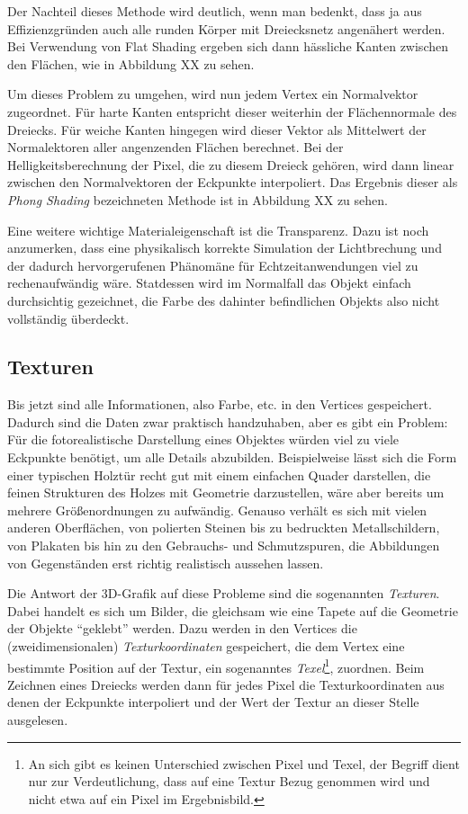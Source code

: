 
Der Nachteil dieses Methode wird deutlich, wenn man bedenkt, dass ja aus Effizienzgründen auch alle runden Körper mit Dreiecksnetz angenähert werden. Bei Verwendung von Flat Shading ergeben sich dann hässliche Kanten zwischen den Flächen, wie in Abbildung XX zu sehen.


Um dieses Problem zu umgehen, wird nun jedem Vertex ein Normalvektor zugeordnet. Für harte Kanten entspricht dieser weiterhin der Flächennormale des Dreiecks. Für weiche Kanten hingegen wird dieser Vektor als Mittelwert der Normalektoren aller angenzenden Flächen berechnet. Bei der Helligkeitsberechnung der Pixel, die zu diesem Dreieck gehören, wird dann linear zwischen den Normalvektoren der Eckpunkte interpoliert. Das Ergebnis dieser als \emph{Phong Shading} bezeichneten Methode ist in Abbildung XX zu sehen.


Eine weitere wichtige Materialeigenschaft ist die Transparenz. Dazu ist noch anzumerken, dass eine physikalisch korrekte Simulation der Lichtbrechung und der dadurch hervorgerufenen Phänomäne für Echtzeitanwendungen viel zu rechenaufwändig wäre. Statdessen wird im Normalfall das Objekt einfach durchsichtig gezeichnet, die Farbe des dahinter befindlichen Objekts also nicht vollständig überdeckt.

\subsection{Texturen}
\label{texturing}
Bis jetzt sind alle Informationen, also Farbe, etc. in den Vertices gespeichert. Dadurch sind die Daten zwar praktisch handzuhaben, aber es gibt ein Problem: Für die fotorealistische Darstellung eines Objektes würden viel zu viele Eckpunkte benötigt, um alle Details abzubilden. Beispielweise lässt sich die Form einer typischen Holztür recht gut mit einem einfachen Quader darstellen, die feinen Strukturen des Holzes mit Geometrie darzustellen, wäre aber bereits um mehrere Größenordnungen zu aufwändig. Genauso verhält es sich mit vielen anderen Oberflächen, von polierten Steinen bis zu bedruckten Metallschildern, von Plakaten bis hin zu den Gebrauchs- und Schmutzspuren, die Abbildungen von Gegenständen erst richtig realistisch aussehen lassen.

Die Antwort der 3D-Grafik auf diese Probleme sind die sogenannten \emph{Texturen}. Dabei handelt es sich um Bilder, die gleichsam wie eine Tapete auf die Geometrie der Objekte \enquote{geklebt} werden. Dazu werden in den Vertices die (zweidimensionalen) \emph{Texturkoordinaten} gespeichert, die dem Vertex eine bestimmte Position auf der Textur, ein sogenanntes \emph{Texel}\footnote{An sich gibt es keinen Unterschied zwischen Pixel und Texel, der Begriff dient nur zur Verdeutlichung, dass auf eine Textur Bezug genommen wird und nicht etwa auf ein Pixel im Ergebnisbild.}, zuordnen. Beim Zeichnen eines Dreiecks werden dann für jedes Pixel die Texturkoordinaten aus denen der Eckpunkte interpoliert und der Wert der Textur an dieser Stelle ausgelesen.

